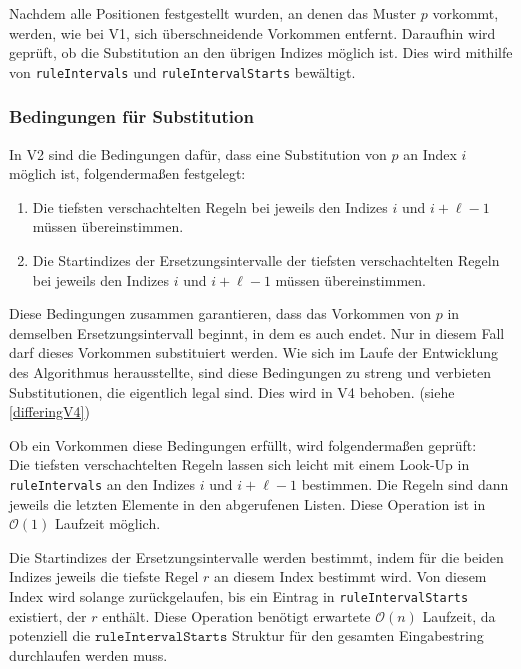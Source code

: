 Nachdem alle Positionen festgestellt wurden, an denen das Muster $p$ vorkommt, werden, wie bei V1, sich überschneidende Vorkommen entfernt. Daraufhin wird geprüft, ob die Substitution an den übrigen Indizes möglich ist. Dies wird mithilfe von \texttt{ruleIntervals} und \texttt{ruleIntervalStarts} bewältigt.

\subsubsection{Bedingungen für Substitution}
\label{v2substitutionconditions}

In V2 sind die Bedingungen dafür, dass eine Substitution von $p$ an Index $i$ möglich ist, folgendermaßen festgelegt:

\begin{enumerate}
	\item Die tiefsten verschachtelten Regeln bei jeweils den Indizes $i$ und $i + \ell - 1$ müssen übereinstimmen.
	\item Die Startindizes der Ersetzungsintervalle der tiefsten verschachtelten Regeln bei jeweils den Indizes $i$ und $i + \ell - 1$ müssen übereinstimmen. 
\end{enumerate}

Diese Bedingungen zusammen garantieren, dass das Vorkommen von $p$ in demselben Ersetzungsintervall beginnt, in dem es auch endet. Nur in diesem Fall darf dieses Vorkommen substituiert werden. Wie sich im Laufe der Entwicklung des Algorithmus herausstellte, sind diese Bedingungen zu streng und verbieten Substitutionen, die eigentlich legal sind. Dies wird in V4 behoben. (siehe \autoref{differingV4})

Ob ein Vorkommen diese Bedingungen erfüllt, wird folgendermaßen geprüft:\\
Die tiefsten verschachtelten Regeln lassen sich leicht mit einem Look-Up in \texttt{ruleIntervals} an den Indizes $i$ und $i + \ell - 1$ bestimmen. Die Regeln sind dann jeweils die letzten Elemente in den abgerufenen Listen. Diese Operation ist in $\mathcal{O}(1)$ Laufzeit möglich.

Die Startindizes der Ersetzungsintervalle werden bestimmt, indem für die beiden Indizes jeweils die tiefste Regel $r$ an diesem Index bestimmt wird. Von diesem Index wird solange zurückgelaufen, bis ein Eintrag in \texttt{ruleIntervalStarts} existiert, der $r$ enthält. Diese Operation benötigt erwartete $\mathcal{O}(n)$ Laufzeit, da potenziell die $\texttt{ruleIntervalStarts}$ Struktur für den gesamten Eingabestring durchlaufen werden muss.


